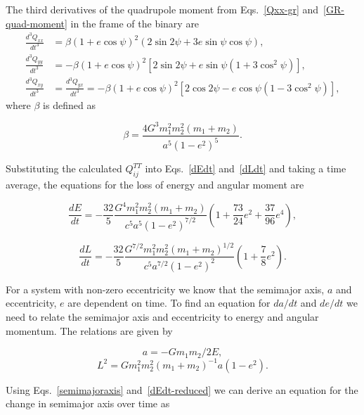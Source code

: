 The third derivatives of the quadrupole moment from Eqs.~\ref{Qxx-gr} and~\ref{GR-quad-moment} in the frame of the binary are~\cite{Peters:1963ux}
\begin{equation}
    \begin{split}
        \frac{d^3Q_{xx}}{dt^3} &= \beta(1+e\cos\psi)^2(2\sin2\psi + 3e\sin\psi\cos\psi), \\
        \frac{d^3Q_{yy}}{dt^3} &= -\beta(1+e\cos\psi)^2[2\sin2\psi + e\sin\psi(1+3\cos^2\psi)], \\
        \frac{d^3Q_{xy}}{dt^3} &= \frac{d^3Q_{yx}}{dt^3} = -\beta(1+e\cos\psi)^2[2\cos2\psi - e\cos\psi(1-3\cos^2\psi)],
    \end{split}
\end{equation}
where $\beta$ is defined as

\begin{equation}
    \beta = \frac{4G^3m_1^2m_2^2(m_1+m_2)}{a^5(1-e^2)^5}.
\end{equation}

Substituting the calculated $Q^{TT}_{ij}$ into Eqs.~\ref{dEdt} and~\ref{dLdt} and taking a time average, the equations for the loss of energy and angular moment are

\begin{equation}\label{dEdt-reduced}
    \frac{dE}{dt} = -\frac{32}{5}\frac{G^4m_1^2m_2^2(m_1+m_2)}{c^5a^5(1-e^2)^{7/2}}\left(1+\frac{73}{24}e^2+\frac{37}{96}e^4\right),
\end{equation}

\begin{equation}\label{dLdt-reduced}
    \frac{dL}{dt} = -\frac{32}{5}\frac{G^{7/2}m_1^2m_2^2(m_1+m_2)^{1/2}}{c^5a^{7/2}(1-e^2)^2}\left(1+\frac{7}{8}e^2\right).
\end{equation}

For a system with non-zero eccentricity we know that the semimajor axis, $a$ and eccentricity, $e$ are dependent on time. To find an equation for $da/dt$ and $de/dt$ we need to relate the semimajor axis and eccentricity to energy and angular momentum. The relations are given by

\begin{equation}\label{semimajoraxis}
    a = -Gm_1m_2/2E,
\end{equation}
\begin{equation}\label{angularmomentum}
    L^2 = Gm_1^2m_2^2(m_1+m_2)^{-1}a(1-e^2).
\end{equation}

Using Eqs.~\ref{semimajoraxis} and~\ref{dEdt-reduced} we can derive an equation for the change in semimajor axis over time as

